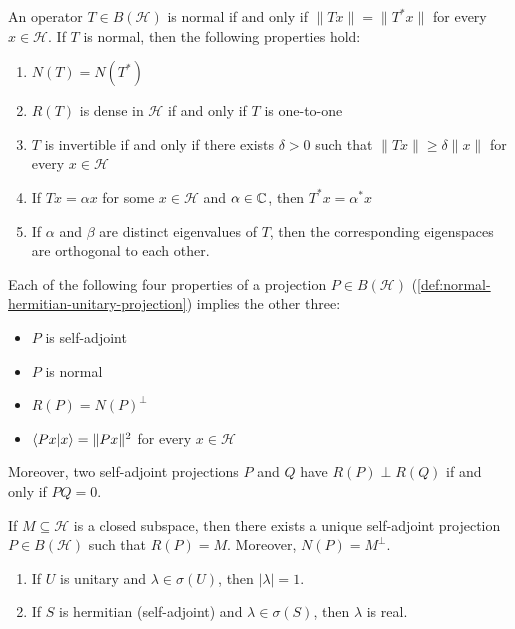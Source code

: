 \begin{theorem}
An operator $T \in B(\mathcal{H})$ is normal if and only if $\|Tx\| = \|T^* x\|$ for every $x \in \mathcal{H}$.
If $T$ is normal, then the following properties hold:
\begin{enumerate}[label=(\alph*)]
\item $N(T) = N(T^*)$
\item $R(T)$ is dense in $\mathcal{H}$ if and only if $T$ is one-to-one
\item $T$ is invertible if and only if there exists $\delta > 0$ such that $\|Tx\| \geq \delta \|x\|$ for every $x \in \mathcal{H}$
\item If $Tx = \alpha x$ for some $x \in \mathcal{H}$ and $\alpha \in \mathbb{C}$, then $T^* x = \alpha^* x$
\item If $\alpha$ and $\beta$ are distinct eigenvalues of $T$, then the corresponding eigenspaces are orthogonal to each other.
\qedhere
\end{enumerate}
\end{theorem}


\begin{theorem}\label{thm:projection-properties}
Each of the following four properties of a projection $P \in B(\mathcal{H})$ (\autoref{def:normal-hermitian-unitary-projection}) implies the other three:
\begin{itemize}
  \item $P$ is self-adjoint
  \item $P$ is normal
  \item $R(P) = N(P)^\perp$
  \item $\braket{Px | x} = \|Px\|^2$ for every $x \in \mathcal{H}$
\end{itemize}
Moreover, two self-adjoint projections $P$ and $Q$ have $R(P) \perp R(Q)$ if and only if $PQ = 0$.
\end{theorem}

\begin{theorem}\label{prop:orthogonal-projection-closed-subspace}
If $M \subseteq \mathcal H$ is a closed subspace, then there exists a unique self-adjoint projection $P \in B(\mathcal H)$ such that
\(
R(P)=M
\).
Moreover,
\(
N(P)=M^\perp
\).
\end{theorem}

\begin{theorem}
\begin{enumerate}[label=(\alph*)]
\item If $U$ is unitary and $\lambda \in \sigma(U)$, then $|\lambda| = 1$.
\item If $S$ is hermitian (self-adjoint) and $\lambda \in \sigma(S)$, then $\lambda$ is real.
\qedhere
\end{enumerate}
\end{theorem}



